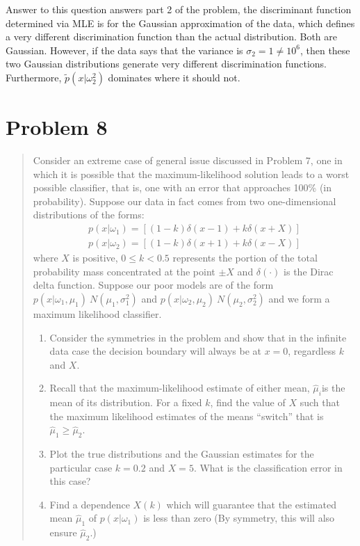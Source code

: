 \documentclass[11pt]{article}
\begin{document}
Answer to this question answers part 2 of the problem, the discriminant function determined via MLE is for the Gaussian approximation of the data, which defines a very different discrimination function than the actual distribution.  Both are Gaussian.  However, if the data says that the variance is $\sigma_2 = 1 \neq 10^6$, then these two Gaussian distributions generate very different discrimination functions.  Furthermore, $\tilde p(x | \omega^2_2)$ dominates where it should not.  

\newpage
\section{Problem 8}
\begin{quote}
Consider an extreme case of general issue discussed in Problem 7, one in which it is possible that the maximum-likelihood solution leads to a worst possible classifier, that is, one with an error that approaches 100\% (in probability).  Suppose our data in fact comes from two one-dimensional distributions of the forms:
\begin{eqnarray}
	p(x| \omega_1) = [(1-k)\delta (x-1) + k \delta(x + X)] \\
	p(x | \omega_2) = [(1-k)\delta (x+1) + k \delta (x - X)]
\end{eqnarray}
where $X$ is positive, $0 \le k < 0.5$ represents the portion of the total probability mass concentrated at the point $\pm X$
  and $\delta(\cdot)$ is the Dirac delta function.  Suppose our poor models are of the form $p(x| \omega_1, \mu_1)~N(\mu_1 , \sigma_1 ^2)$ and $p(x | \omega_2 , \mu_2) ~N(\mu_2, \sigma_2 ^2)$ and we form a maximum likelihood classifier.  
\begin{enumerate}
	\item Consider the symmetries in the problem and show that in the infinite data case the decision boundary will always be at $x=0$, regardless $k$ and $X$.
	\item Recall that the maximum-likelihood estimate of either mean, $\hat{\mu}_i$is the mean of its distribution.  For a fixed $k$, find the value of $X$ such that the maximum likelihood estimates of the means ``switch''  that is $\hat{\mu}_1 \ge \hat{\mu}_2$.
	\item Plot the true distributions and the Gaussian estimates for the particular case $k=0.2$ and $X=5$.  What is the classification error in this case?
	\item Find a dependence $X(k)$ which will guarantee that the estimated mean $\hat{\mu}_1$ of $p(x | \omega_1)$ is less than zero (By symmetry, this will also ensure $\hat{\mu}_2$.)

\end{enumerate}
\end{quote}
\end{document}
